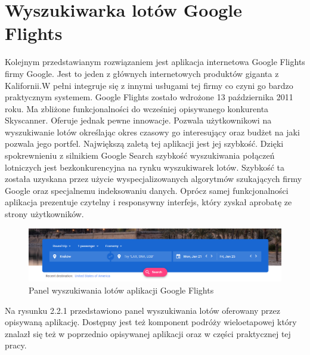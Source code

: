 \documentclass[12pt, twoside]{report}
\begin{document}
\section{Wyszukiwarka lotów Google Flights}
Kolejnym przedstawianym rozwiązaniem jest aplikacja internetowa Google Flights firmy Google. Jest to jeden z głównych internetowych produktów giganta z Kalifornii.W pełni integruje się z innymi usługami tej firmy co czyni go bardzo praktycznym systemem. Google Flights zostało wdrożone 13 października 2011 roku. Ma zbliżone funkcjonalności do wcześniej opisywanego konkurenta Skyscanner. Oferuje jednak pewne innowacje. Pozwala użytkownikowi na wyszukiwanie lotów określając okres czasowy go interesujący oraz budżet na jaki pozwala jego portfel. Największą zaletą tej aplikacji jest jej szybkość. Dzięki spokrewnieniu z silnikiem Google Search szybkość wyszukiwania połączeń lotniczych jest bezkonkurencyjna na rynku wyszukiwarek lotów. Szybkość ta została uzyskana przez użycie wyspecjalizowanych algorytmów szukających firmy Google oraz specjalnemu indeksowaniu danych.
Oprócz samej funkcjonalności aplikacja prezentuje czytelny i responsywny interfejs, który zyskał aprobatę ze strony użytkowników.


\begin{figure}[!ht]
\centering
\includegraphics[scale=0.50, keepaspectratio]{google_flights_search_panel.png}
\caption{Panel wyszukiwania lotów aplikacji Google Flights}
\label{fig:google_flights_search_panel}
\end{figure}
Na rysunku 2.2.1 przedstawiono panel wyszukiwania lotów oferowany przez opisywaną aplikację. Dostępny jest też komponent podróży wieloetapowej który znalazł się też w poprzednio opisywanej aplikacji oraz w części praktycznej tej pracy.
\end{document}
